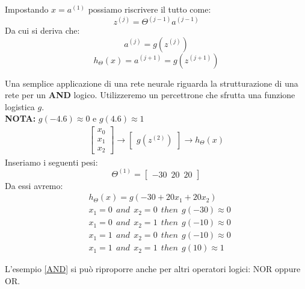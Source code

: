  Impostando $x=a^{(1)}$ possiamo riscrivere il tutto come:
 \[z^{(j)} = \Theta^{(j-1)}a^{(j-1)}\]
 Da cui si deriva che:
 \[a^{(j)} = g(z^{(j)})\]
 \[h_\Theta(x) = a^{(j+1)} = g(z^{(j+1)})\]
\begin{esempio}
    Una semplice applicazione di una rete neurale riguarda la strutturazione di una rete per un \textbf{AND} logico. Utilizzeremo un percettrone che sfrutta una funzione logistica $g$.\\
    \textbf{NOTA:} $g(-4.6) \approx 0$ e $g(4.6) \approx 1$ 
    \begin{align}\begin{bmatrix}x_0 \nonumber \\ x_1 \nonumber \\ x_2\end{bmatrix} \rightarrow\begin{bmatrix}g(z^{(2)})\end{bmatrix} \rightarrow h_\Theta(x)\end{align}
    Inseriamo i seguenti pesi:
    \[\Theta^{(1)} = \begin{bmatrix}-30\,\,\,20\,\,\,20\end{bmatrix}\]
    Da essi avremo:
    \begin{align}& h_\Theta(x) = g(-30 + 20x_1 + 20x_2) \nonumber \\ & x_1 = 0 \ \ and \ \ x_2 = 0 \ \ then \ \ g(-30) \approx 0 \nonumber \\ & x_1 = 0 \ \ and \ \ x_2 = 1 \ \ then \ \ g(-10) \approx 0 \nonumber \\ & x_1 = 1 \ \ and \ \ x_2 = 0 \ \ then \ \ g(-10) \approx 0 \nonumber \\ & x_1 = 1 \ \ and \ \ x_2 = 1 \ \ then \ \ g(10) \approx 1 \nonumber \end{align}
    \label{AND}
\end{esempio}
L'esempio \ref{AND} si può riproporre anche per altri operatori logici: NOR oppure OR.
